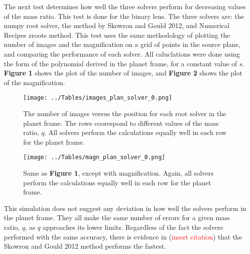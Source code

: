 \documentclass{article}
\newcommand\fixlater[1]{\textcolor{red}{#1}}
\begin{document}

The next test determines how well the three solvers perform for decreasing
values of the mass ratio. This test is done for the binary lens. The three
solvers are: the numpy root solver, the method by Skowron and Gould 2012, and
Numerical Recipes zroots method. This test uses the same methodology of
plotting the number of images and the magnification on a grid of points in
the source plane, and comparing the performance of each solver. All
caluclations were done using the form of the polynomial derived in the
planet frame, for a constant value of $s$. \textbf{Figure 1} shows the
plot of the number of images, and \textbf{Figure 2} shows the plot of
the magnification.

\begin{figure}
	\texttt{[image: ../Tables/images\_plan\_solver\_0.png]}
	\caption{The number of images versus the position for each root solver
	in the planet frame. The rows coorespond to different values of the
	mass ratio, $q$. All solvers perform the calculations equally well in
	each row for the planet frame.}
\end{figure}

\begin{figure}
	\texttt{[image: ../Tables/magn\_plan\_solver\_0.png]}
	\caption{Same as \textbf{Figure 1}, except with magnification. Again,
	all solvers perform the calculations equally well in each row for the
	planet frame.}
\end{figure}


This simulation does not suggest any deviation in how well the solvers
perform in the planet frame. They all make the same number of errors 
for a given mass ratio, $q$, as $q$ approaches its lower limits. Regardless
of the fact the solvers performed with the same accuracy, there is evidence
in (\fixlater{insert citation}) that the Skowron and Gould 2012 method performs
the fastest.
\end{document}
